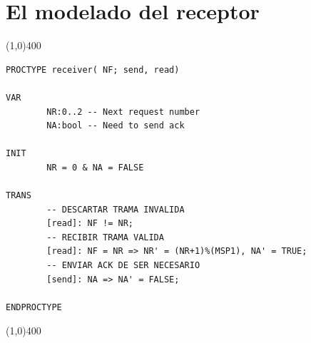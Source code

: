 \documentclass[pdftex,a4paper,12pt]{book}
\begin{document}
\section*{El modelado del receptor}

\noindent \line(1,0){400}
\begin{verbatim}
PROCTYPE receiver( NF; send, read)

VAR
        NR:0..2 -- Next request number
        NA:bool -- Need to send ack

INIT
        NR = 0 & NA = FALSE

TRANS
        -- DESCARTAR TRAMA INVALIDA
        [read]: NF != NR;
        -- RECIBIR TRAMA VALIDA
        [read]: NF = NR => NR' = (NR+1)%(MSP1), NA' = TRUE;
        -- ENVIAR ACK DE SER NECESARIO
        [send]: NA => NA' = FALSE;

ENDPROCTYPE
\end{verbatim}
\noindent \line(1,0){400}
\end{document}
